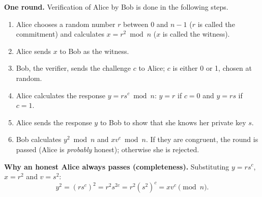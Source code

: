 \textbf{One round.} Verification of Alice by Bob is done in the following steps.
\begin{enumerate}
  \item Alice chooses a random number $r$ between 0 and $n - 1$ ($r$ is called the commitment) and calculates $x = r^2 \bmod n$ ($x$ is called the witness).
  \item Alice sends $x$ to Bob as the witness.
  \item Bob, the verifier, sends the challenge $c$ to Alice; $c$ is either 0 or 1, chosen at random.
  \item Alice calculates the response $y = r s^c \bmod n$: $y = r$ if $c = 0$ and $y = rs$ if $c = 1$.
  \item Alice sends the response $y$ to Bob to show that she knows her private key $s$.
  \item Bob calculates $y^2 \bmod n$ and $x v^c \bmod n$. If they are congruent, the round is passed (Alice is \emph{probably} honest); otherwise she is rejected.
\end{enumerate}
\begin{center}
\end{center}

\textbf{Why an honest Alice always passes (completeness).} Substituting $y = r s^c$, $x = r^2$ and $v = s^2$:
\[
y^2 = (r s^c)^2 = r^2 s^{2c} = r^2 (s^2)^c = x v^c \pmod n .
\]

